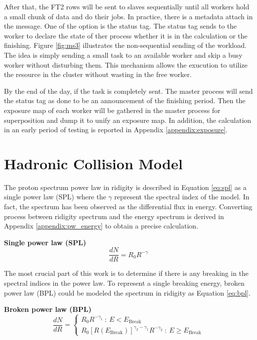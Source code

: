After that, the FT2 rows will be sent to slaves sequentially until
all workers hold a small chunk of data and do their jobs.
In practice, there is a metadata attach in the message. 
One of the option is the status tag. The status tag sends to the 
worker to declare the state of ther process whether it is in the 
calculation or the finishing. Figure \ref{fig:ms3} illustrates 
the non-sequential sending of the workload. The idea is simply 
sending a small task to an available worker and skip a busy worker
without disturbing them. This mechanism allows the exucution to utilize 
the resource in the cluster without wasting in the free worker.


By the end of the day, if the task is completely sent.
The master process will send the status tag as done to be an 
announcement of the finishing period. Then the exposure map of 
each worker will be gathered in the master process for superposition
and dump it to unify an exposure map. In addition, the calculation 
in an early period of testing is reported in Appendix \ref{appendix:exposure}.


\section{Hadronic Collision Model}
The proton spectrum power law in ridigity is described in Equation \ref{eq:spl}
as a single power law (SPL)
where the $\gamma$ represent the spectral index of the model. 
In fact, the spectrum has been observed as the differential flux 
in energy. Converting process between ridigity spectrum and the 
energy spectrum is derived in Appendix \ref{appendix:pw_energy} to 
obtain a precise calculation.


\textbf{Single power law (SPL)}
\begin{equation}
    \frac{dN}{dR} = R_0R^{-\gamma}
    \label{eq:spl}
\end{equation}

The most crucial part of this work is to determine if there is any 
breaking in the spectral indices in the power law. To represent 
a single breaking energy, broken power law (BPL) could be modeled 
the spectrum in ridigity as Equation \ref{eq:bpl}.


\textbf{Broken power law (BPL)}
\begin{equation}
\frac{dN}{dR}=
  \begin{cases}
    R_0R^{-\gamma_1}\ :\ E < E_{\text{Break}}\\
    R_0[R(E_{\text{Break}})]^{\gamma_2-\gamma_1}R^{-\gamma_2}\ :\ E \ge E_{\text{Break}}
  \end{cases}
  \label{eq:bpl}
\end{equation}

